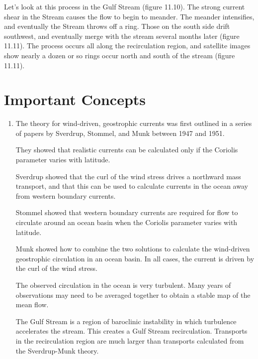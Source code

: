 Let's look at this process in the Gulf Stream (figure 11.10). The strong current
shear in the Stream causes the flow to begin to meander. The meander intensifies,
and eventually the Stream throws off a ring. Those on the south side drift
southwest, and eventually merge with the stream several months later (figure
11.11). The process occurs all along the recirculation region, and satellite
images show nearly a dozen or so rings occur north and south of the stream
(figure 11.11).

\section{Important Concepts}
\begin{enumerate}

\item The theory for wind-driven, geostrophic currents was first outlined in a series of papers by Sverdrup, Stommel, and Munk between
1947 and 1951.

\vitem They showed that realistic currents can be calculated only if the
Coriolis parameter varies with latitude.

\vitem Sverdrup showed that the curl of the wind stress drives a
northward mass transport, and that this can be used to calculate
currents in the ocean away from western boundary currents.

\vitem Stommel showed that western boundary currents are required for flow to
circulate around an ocean basin when the Coriolis parameter varies
with latitude.

\vitem Munk showed how to combine the two solutions to calculate the
wind-driven geostrophic circulation in an ocean
basin. In all cases, the current is driven by the curl of the wind stress.

\vitem The observed circulation in the ocean is very turbulent. Many years of
observations may need to be averaged together to obtain a stable map of the mean
flow.

\vitem The Gulf Stream is a region of baroclinic instability in which
turbulence accelerates the stream. This creates a Gulf Stream
recirculation. Transports in the recirculation region are much larger than
transports calculated from the Sverdrup-Munk theory.
\end{enumerate}


